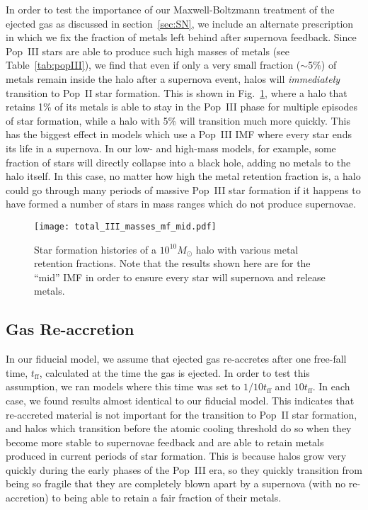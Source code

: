 \documentclass[a4paper,fleqn,usenatbib]{mnras}
\begin{document}
In order to test the importance of our Maxwell-Boltzmann treatment of the ejected gas as discussed in section~\ref{sec:SN}, we include an alternate prescription in which we fix the fraction of metals left behind after supernova feedback. Since Pop~III stars are able to produce such high masses of metals (see 
Table~\ref{tab:popIII}), we find that 
even if only a very small fraction ($\sim$5\%) of metals remain inside the halo after a supernova event, halos will \emph{immediately} transition to Pop~II star formation. This is shown in Fig.~\ref{fig:retention}, where a halo that retains 1\% of its metals is able to stay in the Pop~III phase for multiple episodes of star formation, while a halo with 5\% will transition much more quickly. This 
has the biggest effect in models which use a Pop~III IMF where every star ends its life in a supernova. In our low- and high-mass models, for example, some fraction of stars will directly collapse into a black hole, adding no metals to the halo itself. In this case, no matter how high the metal retention fraction is, a halo could go through many periods of massive Pop~III star formation if it happens to have formed a number of stars in mass ranges which do not produce supernovae.

\begin{figure}
	\texttt{[image: total\_III\_masses\_mf\_mid.pdf]}
    \caption{Star formation histories of a $10^{10} M_\odot$ halo with various metal retention fractions. Note that the results shown here are for the ``mid'' IMF in order to ensure every star will supernova and release metals.}
    \label{fig:retention}
\end{figure}

\subsection{Gas Re-accretion}
\label{sec:reaccretion}

In our fiducial model, we assume that ejected gas re-accretes after one free-fall time, $t_\text{ff}$, calculated at the time the gas is ejected. In order to test this assumption, we ran models where this time was set to $1/10 t_\text{ff}$ and $10 t_\text{ff}$. In each case, we found results almost identical to our fiducial model. This indicates that re-accreted material is not important for the transition to Pop~II star formation, and halos which transition before the atomic cooling threshold do so when they become more stable to supernovae feedback and are able to retain metals produced in current periods of star formation.
This is because halos grow very quickly during the early phases of the Pop~III era, so they quickly transition from being so fragile that they are completely blown apart by a supernova (with no re-accretion) to being able to retain a fair fraction of their metals.
\end{document}
